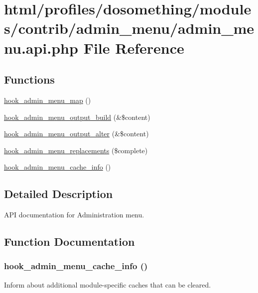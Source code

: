 \hypertarget{admin__menu_8api_8php}{
\section{html/profiles/dosomething/modules/contrib/admin\_\-menu/admin\_\-menu.api.php File Reference}
\label{admin__menu_8api_8php}
}
\subsection*{Functions}
\begin{DoxyCompactItemize}
\item 
\hyperlink{admin__menu_8api_8php_a4b3f2235db483f670a2e7327633868df}{hook\_\-admin\_\-menu\_\-map} ()
\item 
\hyperlink{admin__menu_8api_8php_a12517a63549c0d184148d7b5ed9907f4}{hook\_\-admin\_\-menu\_\-output\_\-build} (\&\$content)
\item 
\hyperlink{admin__menu_8api_8php_a7502be228e9b3e1a04cbc17fa0e42b25}{hook\_\-admin\_\-menu\_\-output\_\-alter} (\&\$content)
\item 
\hyperlink{admin__menu_8api_8php_af3a48610c3fd1e828a053625d0184fa1}{hook\_\-admin\_\-menu\_\-replacements} (\$complete)
\item 
\hyperlink{admin__menu_8api_8php_a4458e9bb8dfc9515707b474b9faceca6}{hook\_\-admin\_\-menu\_\-cache\_\-info} ()
\end{DoxyCompactItemize}


\subsection{Detailed Description}
API documentation for Administration menu. 

\subsection{Function Documentation}
\hypertarget{admin__menu_8api_8php_a4458e9bb8dfc9515707b474b9faceca6}{
\subsubsection[{hook\_\-admin\_\-menu\_\-cache\_\-info}]{\setlength{\rightskip}{0pt plus 5cm}hook\_\-admin\_\-menu\_\-cache\_\-info ()}}
\label{admin__menu_8api_8php_a4458e9bb8dfc9515707b474b9faceca6}
Inform about additional module-\/specific caches that can be cleared.

